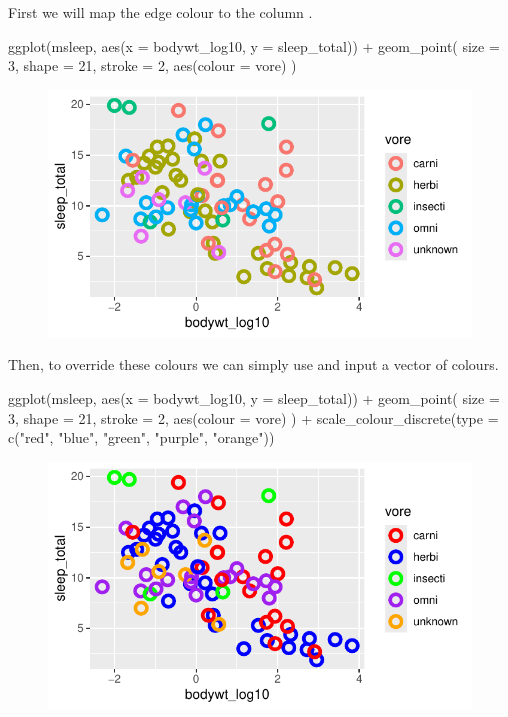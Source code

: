 \noindent
First we will map the edge colour to the column .

\begin{inR}
ggplot(msleep, aes(x = bodywt_log10, y = sleep_total)) +
  geom_point(
    size = 3, shape = 21, stroke = 2,
    aes(colour = vore)
  )
\end{inR}

\vspace{2em}

\begin{figure}[H]
\includegraphics[scale = .75]{graphics/ch2Figs/ggEx_21.pdf}
\end{figure}

\noindent
Then, to override these colours we can simply use  and input a vector of colours.

\begin{inR}
ggplot(msleep, aes(x = bodywt_log10, y = sleep_total)) +
  geom_point(
    size = 3, shape = 21, stroke = 2,
    aes(colour = vore)
  ) +
  scale_colour_discrete(type = c("red", "blue", "green", "purple", "orange"))
\end{inR}

\vspace{2em}

\begin{figure}[H]
\includegraphics[scale = .75]{graphics/ch2Figs/ggEx_22.pdf}
\end{figure}

